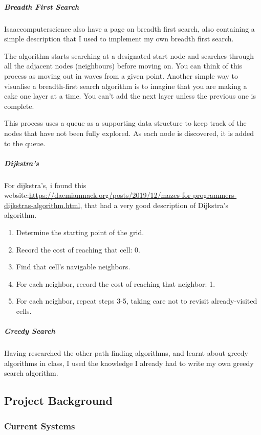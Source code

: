 \documentclass[titlepage]{article}
\begin{document}
\subparagraph*{Breadth First Search}
Isaaccomputerscience also have a page on breadth first search, also containing a simple description that I used to implement my own breadth first search.
\begin{quoting}
    The algorithm starts searching at a designated start node and searches through all the adjacent nodes (neighbours) before moving on. You can think of this process as moving out in waves from a given point. Another simple way to visualise a breadth-first search algorithm is to imagine that you are making a cake one layer at a time. You can't add the next layer unless the previous one is complete.

    This process uses a queue as a supporting data structure to keep track of the nodes that have not been fully explored. As each node is discovered, it is added to the queue.
\end{quoting} 

\subparagraph*{Dijkstra's}
For dijkstra's, i found this website:\url{https://daemianmack.org/posts/2019/12/mazes-for-programmers-dijkstras-algorithm.html}, that had a very good description of Dijkstra's algorithm. 
\begin{quoting}
    \begin{enumerate}
        \item Determine the starting point of the grid.
        \item Record the cost of reaching that cell: 0.
        \item Find that cell's navigable neighbors.
        \item For each neighbor, record the cost of reaching that neighbor: 1.
        \item For each neighbor, repeat steps 3-5, taking care not to revisit already-visited cells.
    \end{enumerate}
\end{quoting}

\subparagraph*{Greedy Search}
Having researched the other path finding algorithms, and learnt about greedy algorithms in class, I used the knowledge I already had to write my own greedy search algorithm.

\subsection{Project Background}
\subsubsection{Current Systems}
\end{document}
